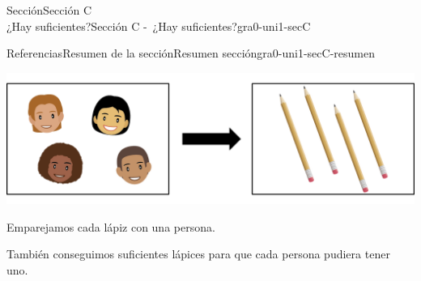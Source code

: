 \begin{sectionptx}{Sección}{{\Large Sección C\\}¿Hay suficientes?}{}{Sección C -~¿Hay suficientes?}{}{}{gra0-uni1-secC}
\begin{references-subsection}{Referencias}{Resumen de la sección}{}{Resumen sección}{}{}{gra0-uni1-secC-resumen}
\begin{image}{0}{1}{0}{}
\includegraphics[max width=\linewidth, center]{external/png-source/K.1.C Beta Student Workbook.4Kids4Pencils.png}
\end{image}%
Emparejamos cada lápiz con una persona.%
\par
También conseguimos suficientes lápices para que cada persona pudiera tener uno.%
\end{references-subsection}
\end{sectionptx}
%
%
\typeout{************************************************}
\typeout{************************************************}
%
